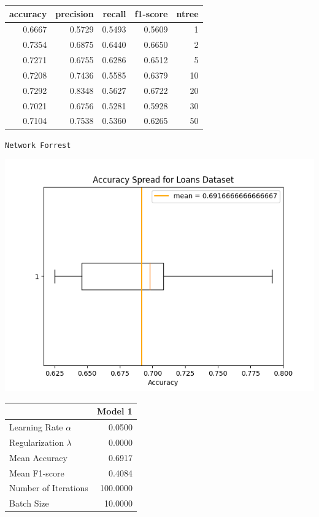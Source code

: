 \documentclass{article}
\begin{document}
\begin{center}
    \begin{tabular}{rrrrr}
    \toprule
    accuracy & precision & recall & f1-score & ntree \\
    \midrule
    0.6667 & 0.5729 & 0.5493 & 0.5609 & 1 \\
    0.7354 & 0.6875 & 0.6440 & 0.6650 & 2 \\
    0.7271 & 0.6755 & 0.6286 & 0.6512 & 5 \\
    0.7208 & 0.7436 & 0.5585 & 0.6379 & 10 \\
    0.7292 & 0.8348 & 0.5627 & 0.6722 & 20 \\
    0.7021 & 0.6756 & 0.5281 & 0.5928 & 30 \\
    0.7104 & 0.7538 & 0.5360 & 0.6265 & 50 \\
    \bottomrule
    \end{tabular}
\end{center}
\restoregeometry
\begin{center}
    \texttt{Network Forrest}
\end{center}
\begin{minipage}{0.49\textwidth}
    \centering
    \includegraphics*[width=\textwidth]{./src/figures/Loans Dataset_variant.png}
\end{minipage}
\hfill
\begin{minipage}{0.49\textwidth}
    \centering
    \begin{tabular}{lr}
        \toprule
         & Model 1 \\
        \midrule
        Learning Rate $\alpha$ & 0.0500 \\
        Regularization $\lambda$ & 0.0000 \\
        Mean Accuracy & 0.6917 \\
        Mean F1-score & 0.4084 \\
        Number of Iterations & 100.0000 \\
        Batch Size & 10.0000 \\
        \bottomrule
        \end{tabular}
\end{minipage}
\end{document}

